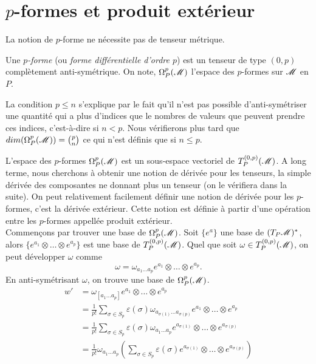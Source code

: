 \documentclass[a4paper,11pt]{report}
\begin{document}
        \section{$p$-formes et produit extérieur}
        
            La notion de $p$-forme ne nécessite pas de tenseur métrique.
            
            \begin{definition}
                Une $p$\textit{-forme} (ou \textit{forme différentielle d'ordre $p$}) est un tenseur de type $(0,p)$ complètement anti-symétrique. On note, $\Omega_P^p(\mathscr{M})$ l'espace des $p$-formes sur $\mathscr{M}$ en $P$.
            \end{definition}
            
            \begin{rmk}
                La condition $p\leq n$ s'explique par le fait qu'il n'est pas possible d'anti-symétriser une quantité qui a plus d'indices que le nombres de valeurs que peuvent prendre ces indices, c'est-à-dire si $n<p$. Nous vérifierons plus tard que $dim(\Omega_P^p(\mathscr{M})) = {p \choose n}$ ce qui n'est définis que si $n\leq p$.
            \end{rmk}
            
             L'espace des $p$-formes $\Omega_P^p(\mathscr{M})$ est un sous-espace vectoriel de $T_P^{(0,p)}(\mathscr{M})$. A long terme, nous cherchons à obtenir une notion de dérivée pour les tenseurs, la simple dérivée des composantes ne donnant plus un tenseur (on le vérifiera dans la suite). On peut relativement facilement définir une notion de dérivée pour les $p$-formes, c'est la dérivée extérieur. Cette notion est définie à partir d'une opération entre les $p$-formes appellée produit extérieur.\\
            
            Commençons par trouver une base de $\Omega_P^p(\mathscr{M})$. Soit $\{e^a\}$ une base de $(T_P\mathscr{M})^*$, alors $\{e^{a_1}\otimes\dots \otimes e^{a_p}\}$ est une base de $T_P^{(0,p)}(\mathscr{M})$. Quel que soit $\omega\in T_P^{(0,p)}(\mathscr{M})$, on peut développer $\omega$ comme
            \begin{equation}
                \omega = \omega_{a_1\dots a_p} e^{a_1}\otimes\dots\otimes e^{a_p}.
            \end{equation}
            En anti-symétrisant $\omega$, on trouve une base de $\Omega_P^p(\mathscr{M})$.
            \begin{align}\label{dev:pformebase}
                w' &= \omega_{[a_1\dots a_p]} e^{a_1}\otimes\dots\otimes e^{a_p}\\
                &= \frac{1}{p!} \sum_{\sigma\in S_p}\varepsilon(\sigma) \omega_{a_{\sigma(1)}\dots a_{\sigma(p)}} e^{a_1}\otimes\dots\otimes e^{a_p}\\
                &= \frac{1}{p!} \sum_{\sigma\in S_p}\varepsilon(\sigma) \omega_{a_1\dots a_p} e^{a_{\sigma(1)}}\otimes\dots\otimes e^{a_{\sigma(p)}}\\
                &= \frac{1}{p!}\omega_{a_1\dots a_p} \left( \sum_{\sigma\in S_p}\varepsilon(\sigma)  e^{a_{\sigma(1)}}\otimes\dots\otimes e^{a_{\sigma(p)}}\right)\label{eq:pformebase}
            \end{align}
            
\end{document}
